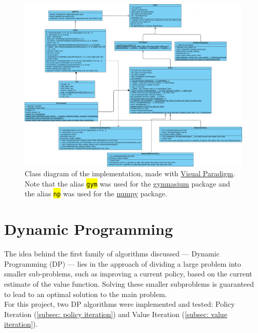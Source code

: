 \documentclass{class}
\def\code#1{\hl{\texttt{#1}}}
\begin{document}
\begin{figure}
    \centering
    \includegraphics[width=0.99\linewidth]{../plots/rl_project_uml.png}
    \caption{Class diagram of the implementation, made with \href{https://online.visual-paradigm.com/}{Visual Paradigm}. Note that the alias \code{gym} was used for the \href{https://gymnasium.farama.org/}{gymnasium} package and the alias \code{np} was used for the \href{https://numpy.org/doc/2.1/index.html}{numpy} package.}
    \label{fig: class diagram}
\end{figure}

\section{Dynamic Programming}
\label{sec: dynamic programming}
The idea behind the first family of algorithms discussed --- Dynamic Programming (DP) --- lies in the approach of dividing a large problem into smaller sub-problems, such as improving a current policy, based on the current estimate of the value function. Solving these smaller subproblems is guaranteed to lead to an optimal solution to the main problem.
\\[0.3cm]
For this project, two DP algorithms were implemented and tested: Policy Iteration (\autoref{subsec: policy iteration}) and Value Iteration (\autoref{subsec: value iteration}).
\end{document}
